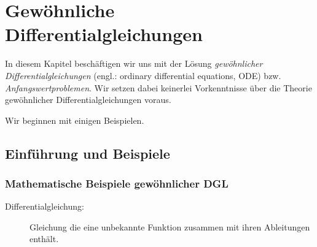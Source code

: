 \documentclass[
]{mycourse}
\theoremstyle{mythm}
\theoremstyle{break}
\begin{document}

\chapter[Gewöhnliche Differentialgleichungen]{Gewöhnliche Differentialgleichungen}

In diesem Kapitel beschäftigen wir uns mit der Lösung \emph{gewöhnlicher Differentialgleichungen} (engl.: ordinary differential equations, ODE) 
bzw. \emph{Anfangswertproblemen}. Wir setzen dabei keinerlei Vorkenntnisse über die Theorie gewöhnlicher Differentialgleichungen voraus.

Wir beginnen mit einigen Beispielen.

\section{Einführung und Beispiele}\label{sect:ODE_intro}

\subsection{Mathematische Beispiele gewöhnlicher DGL}

\begin{description}
\item[Differentialgleichung:] Gleichung die eine unbekannte Funktion zusammen mit ihren Ableitungen enthält.
\end{description}
\end{document}
